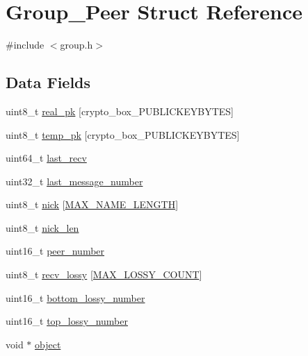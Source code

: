 \hypertarget{struct_group___peer}{\section{Group\+\_\+\+Peer Struct Reference}
\label{struct_group___peer}
}


{\ttfamily \#include $<$group.\+h$>$}

\subsection*{Data Fields}
\begin{DoxyCompactItemize}
\item 
uint8\+\_\+t \hyperlink{struct_group___peer_ab42b4c90d81ac99b968c3edd1e21d706}{real\+\_\+pk} \mbox{[}crypto\+\_\+box\+\_\+\+P\+U\+B\+L\+I\+C\+K\+E\+Y\+B\+Y\+T\+E\+S\mbox{]}
\item 
uint8\+\_\+t \hyperlink{struct_group___peer_a46affbcc202b25e96fd1f5238e9e97e0}{temp\+\_\+pk} \mbox{[}crypto\+\_\+box\+\_\+\+P\+U\+B\+L\+I\+C\+K\+E\+Y\+B\+Y\+T\+E\+S\mbox{]}
\item 
uint64\+\_\+t \hyperlink{struct_group___peer_a03706feea89530a7ac78082fc79ed8fc}{last\+\_\+recv}
\item 
uint32\+\_\+t \hyperlink{struct_group___peer_a1a221b969812bb7c384b0eb23fb1012d}{last\+\_\+message\+\_\+number}
\item 
uint8\+\_\+t \hyperlink{struct_group___peer_ae7cf3fd18e321fab5a711e72622301b9}{nick} \mbox{[}\hyperlink{_messenger_8h_a0c397a708cec89c74029582574516b30}{M\+A\+X\+\_\+\+N\+A\+M\+E\+\_\+\+L\+E\+N\+G\+T\+H}\mbox{]}
\item 
uint8\+\_\+t \hyperlink{struct_group___peer_aa316280abcd8913a502b56397dd13e23}{nick\+\_\+len}
\item 
uint16\+\_\+t \hyperlink{struct_group___peer_a264348ec1f724e05464ca97b7c432817}{peer\+\_\+number}
\item 
uint8\+\_\+t \hyperlink{struct_group___peer_acf8dd69bcbe4de0b5a2b78803925994d}{recv\+\_\+lossy} \mbox{[}\hyperlink{toxcore_2group_8h_a57c6265ee7c8d9829418dc7854749dad}{M\+A\+X\+\_\+\+L\+O\+S\+S\+Y\+\_\+\+C\+O\+U\+N\+T}\mbox{]}
\item 
uint16\+\_\+t \hyperlink{struct_group___peer_ae3d9bdf641a1085fcb1bde6ec076b37d}{bottom\+\_\+lossy\+\_\+number}
\item 
uint16\+\_\+t \hyperlink{struct_group___peer_a9af1180e5be1617fd013dee9ce29bf24}{top\+\_\+lossy\+\_\+number}
\item 
void $\ast$ \hyperlink{struct_group___peer_a077376d12464f945e2414d5499c79b3f}{object}
\end{DoxyCompactItemize}


